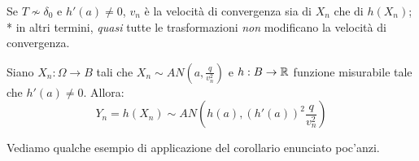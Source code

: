 \medskip
\begin{coro}
  Se $T \nsim \delta_0$ e $h'(a) \neq 0$, $v_n$ è la velocità di convergenza sia di $X_n$ che di $h(X_n)$; \\*
  in altri termini, \emph{quasi} tutte le trasformazioni \emph{non} modificano la velocità di convergenza.
\end{coro}

\medskip
\begin{coro}\label{md1-gauss}
  Siano $X_n: \Omega \to B$ tali che $X_n \sim AN \left( a, \frac q {v_n^2} \right)$ e $h: B \to \mathbb R$ funzione misurabile tale che $h'(a) \neq 0$. Allora:
  $$Y_n = h(X_n) \sim AN \left( h(a), (h'(a))^2 \frac q {v_n^2} \right)$$
\end{coro}



Vediamo qualche esempio di applicazione del corollario enunciato poc'anzi.

